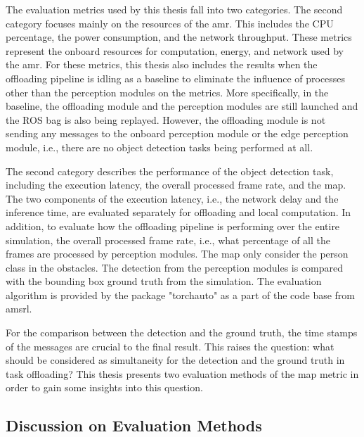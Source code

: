 The evaluation metrics used by this thesis fall into two categories. The second category focuses mainly on the resources of the \gls{amr}. This includes the CPU percentage, the power consumption, and the network throughput. These metrics represent the onboard resources for computation, energy, and network used by the \gls{amr}. For these metrics, this thesis also includes the results when the offloading pipeline is idling as a baseline to eliminate the influence of processes other than the perception modules on the metrics. More specifically, in the baseline, the offloading module and the perception modules are still launched and the ROS bag is also being replayed. However, the offloading module is not sending any messages to the onboard perception module or the edge perception module, i.e., there are no object detection tasks being performed at all. 

The second category describes the performance of the object detection task, including the execution latency, the overall processed frame rate, and the \gls{map}. The two components of the execution latency, i.e., the network delay and the inference time, are evaluated separately for offloading and local computation. In addition, to evaluate how the offloading pipeline is performing over the entire simulation, the overall processed frame rate, i.e., what percentage of all the frames are processed by perception modules. The \gls{map} only consider the person class in the obstacles. The detection from the perception modules is compared with the bounding box ground truth from the simulation. The evaluation algorithm is provided by the package "torchauto" as a part of the code base from \gls{amsrl}. 

For the comparison between the detection and the ground truth, the time stamps of the messages are crucial to the final result. This raises the question: what should be considered as simultaneity for the detection and the ground truth in task offloading? This thesis presents two evaluation methods of the \gls{map} metric in order to gain some insights into this question. 

\subsection{Discussion on Evaluation Methods}

